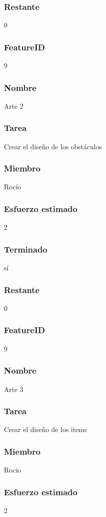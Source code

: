 \subsubsection{Restante} 0



\subsubsection{FeatureID} 9
\subsubsection{Nombre} Arte 2
\subsubsection{Tarea} Crear el diseño de los obstáculos
\subsubsection{Miembro} Rocío
\subsubsection{Esfuerzo estimado} 2
\subsubsection{Terminado} sí
\subsubsection{Restante} 0


\subsubsection{FeatureID} 9
\subsubsection{Nombre} Arte 3
\subsubsection{Tarea} Crear el diseño de los items
\subsubsection{Miembro} Rocio
\subsubsection{Esfuerzo estimado} 2
